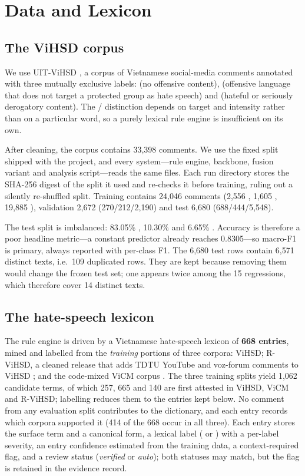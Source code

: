 \section{Data and Lexicon}
\label{sec:data}

\subsection{The ViHSD corpus}
\label{sec:vihsd}

We use UIT-ViHSD \cite{luu2021vihsd}, a corpus of Vietnamese social-media comments
annotated with three mutually exclusive labels: \clean{} (no offensive content),
\off{} (offensive language that does not target a protected group as hate speech)
and \hate{} (hateful or seriously derogatory content). The \off{}/\hate{}
distinction depends on target and intensity rather than on a particular word, so a
purely lexical rule engine is insufficient on its own.

After cleaning, the corpus contains 33{,}398 comments. We use the fixed split shipped
with the project, and every system---rule engine, backbone, fusion variant and
analysis script---reads the same files. Each run directory stores the SHA-256 digest
of the split it used and re-checks it before training, ruling out a silently
re-shuffled split. Training contains 24{,}046 comments (2{,}556 \hate{}, 1{,}605 \off{}, 19{,}885
\clean{}), validation 2{,}672 (270/212/2{,}190) and test 6{,}680 (688/444/5{,}548).

The test split is imbalanced: 83.05\% \clean{}, 10.30\% \hate{} and 6.65\% \off{}.
Accuracy is therefore a poor headline metric---a constant \clean{} predictor already
reaches 0.8305---so macro-F1 is primary, always reported with per-class F1. The
6{,}680 test rows contain 6{,}571 distinct texts, i.e.\ 109 duplicated rows. They
are kept because removing them would change the frozen test set; one appears twice
among the 15 regressions, which therefore cover 14 distinct texts.

\subsection{The hate-speech lexicon}
\label{sec:lexicon}

The rule engine is driven by a Vietnamese hate-speech lexicon of \textbf{668
entries}, mined and labelled from the \emph{training} portions of three corpora:
ViHSD; R-ViHSD, a cleaned release that adds TDTU YouTube and voz-forum comments to
ViHSD \cite{bontoriTdtu}; and the code-mixed ViCM corpus \cite{nguyen2026vicm}. The
three training splits yield 1{,}062 candidate terms, of which 257, 665 and 140 are first
attested in ViHSD, ViCM and R-ViHSD; labelling reduces them to the entries kept below.
No comment from any evaluation split contributes to the dictionary, and each entry
records which corpora supported it (414 of the 668 occur in all three).
Each entry stores the surface term and a canonical form, a lexical label (\hate{} or
\off{}) with a per-label severity, an entry confidence estimated from the training
data, a context-required flag, and a review status (\emph{verified} or
\emph{auto}); both statuses may match, but the flag is retained in the evidence
record.

